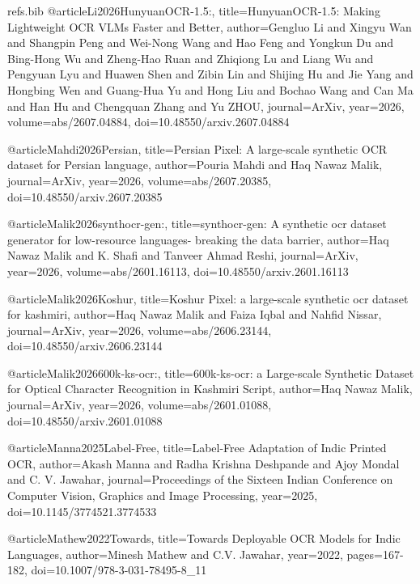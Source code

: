 \begin{filecontents}{refs.bib}
    @article{Li2026HunyuanOCR-1.5:,
    title={HunyuanOCR-1.5: Making Lightweight OCR VLMs Faster and Better},
    author={Gengluo Li and Xingyu Wan and Shangpin Peng and Wei-Nong Wang and Hao Feng and Yongkun Du and Bing-Hong Wu and Zheng-Hao Ruan and Zhiqiong Lu and Liang Wu and Pengyuan Lyu and Huawen Shen and Zibin Lin and Shijing Hu and Jie Yang and Hongbing Wen and Guang-Hua Yu and Hong Liu and Bochao Wang and Can Ma and Han Hu and Chengquan Zhang and Yu ZHOU},
    journal={ArXiv},
    year={2026},
    volume={abs/2607.04884},
    doi={10.48550/arxiv.2607.04884}
    }
    
    @article{Mahdi2026Persian,
    title={Persian Pixel: A large-scale synthetic OCR dataset for Persian language},
    author={Pouria Mahdi and Haq Nawaz Malik},
    journal={ArXiv},
    year={2026},
    volume={abs/2607.20385},
    doi={10.48550/arxiv.2607.20385}
    }
    
    @article{Malik2026synthocr-gen:,
    title={synthocr-gen: A synthetic ocr dataset generator for low-resource languages- breaking the data barrier},
    author={Haq Nawaz Malik and K. Shafi and Tanveer Ahmad Reshi},
    journal={ArXiv},
    year={2026},
    volume={abs/2601.16113},
    doi={10.48550/arxiv.2601.16113}
    }
    
    @article{Malik2026Koshur,
    title={Koshur Pixel: a large-scale synthetic ocr dataset for kashmiri},
    author={Haq Nawaz Malik and Faiza Iqbal and Nahfid Nissar},
    journal={ArXiv},
    year={2026},
    volume={abs/2606.23144},
    doi={10.48550/arxiv.2606.23144}
    }
    
    @article{Malik2026600k-ks-ocr:,
    title={600k-ks-ocr: a Large-scale Synthetic Dataset for Optical Character Recognition in Kashmiri Script},
    author={Haq Nawaz Malik},
    journal={ArXiv},
    year={2026},
    volume={abs/2601.01088},
    doi={10.48550/arxiv.2601.01088}
    }
    
    @article{Manna2025Label-Free,
    title={Label-Free Adaptation of Indic Printed OCR},
    author={Akash Manna and Radha Krishna Deshpande and Ajoy Mondal and C. V. Jawahar},
    journal={Proceedings of the Sixteen Indian Conference on Computer Vision, Graphics and Image Processing},
    year={2025},
    doi={10.1145/3774521.3774533}
    }
    
    @article{Mathew2022Towards,
    title={Towards Deployable OCR Models for Indic Languages},
    author={Minesh Mathew and C.V. Jawahar},
    year={2022},
    pages={167-182},
    doi={10.1007/978-3-031-78495-8_11}
    }
    

\end{filecontents}
